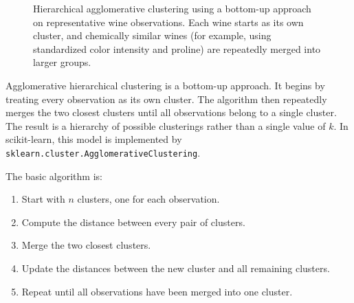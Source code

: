 \documentclass[12pt,letter]{article}
\begin{document}
\begin{figure}[H]
	\caption{Hierarchical agglomerative clustering using a bottom-up approach on representative wine observations. Each wine starts as its own cluster, and chemically similar wines (for example, using standardized color intensity and proline) are repeatedly merged into larger groups.}
	\label{fig:hierarchical_agglomerative_clustering}
\end{figure}





Agglomerative hierarchical clustering is a bottom-up approach. It begins by treating every observation as its own cluster. The algorithm then repeatedly merges the two closest clusters until all observations belong to a single cluster. The result is a hierarchy of possible clusterings rather than a single value of \(k\). In scikit-learn, this model is implemented by \texttt{sklearn.cluster.AgglomerativeClustering}.

The basic algorithm is:
\begin{enumerate}
    \item Start with \(n\) clusters, one for each observation.
    \item Compute the distance between every pair of clusters.
    \item Merge the two closest clusters.
    \item Update the distances between the new cluster and all remaining clusters.
    \item Repeat until all observations have been merged into one cluster.
\end{enumerate}
\end{document}
